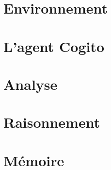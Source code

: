 \section{Environnement}



\section{L'agent \og Cogito \fg{} }



\section{Analyse}



\section{Raisonnement}



\section{Mémoire}

